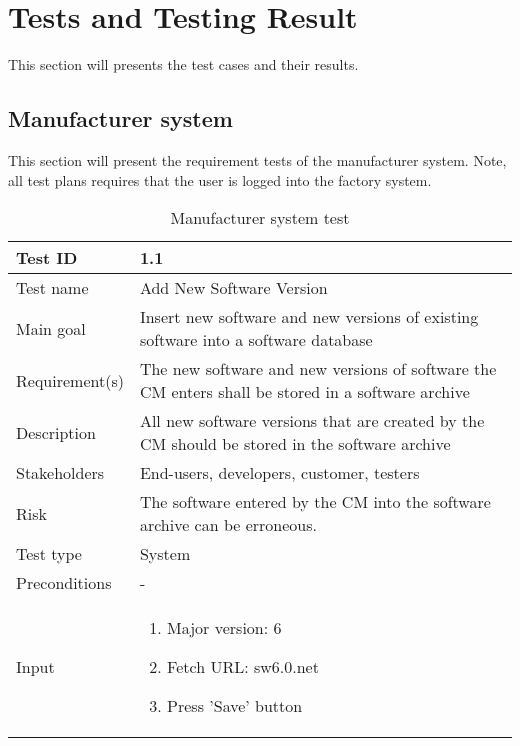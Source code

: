\section{Tests and Testing Result}

This section will presents the test cases and their results. 

\subsection{Manufacturer system}

This section will present the requirement tests of the manufacturer system.
Note, all test plans requires that the user is logged into the factory system.

\begin{table}[H]
\centering
\caption{Manufacturer system test}
\begin{tabularx}{1.0\textwidth}{
    |p{}     %
    |p{}|    %
}
\hline

Test ID
& 1.1
\\
\hline

Test name
& Add New Software Version
\\
\hline

Main goal
& Insert new software and new versions of existing software into a software database
\\
\hline

Requirement(s)
& The new software and new versions of software the CM enters shall be stored in a software archive
\\
\hline

Description
& All new software versions that are created by the CM should be stored in the software archive
\\
\hline

Stakeholders
& End-users, developers, customer, testers
\\
\hline

Risk
& The  software  entered  by  the  CM  into  the  software  archive can be erroneous.
\\
\hline

Test type
& System
\\
\hline

Preconditions
& -
\\
\hline

Input
& \begin{enumerate}
    \item Major version: 6
    \item Fetch URL: sw6.0.net
    \item Press 'Save' button
\end{enumerate}
\\
\hline


\end{tabularx}
\end{table}
